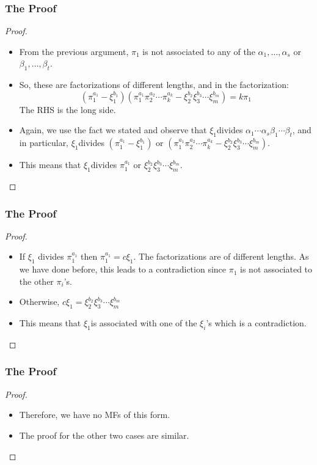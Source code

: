 \begin{frame}
  \frametitle{The Proof}
  \begin{proof}
    \begin{itemize}
      \item<1-> From the previous argument, $\pi_{1}$ is not associated to any of the $\alpha_{1},\ldots,\alpha_{s}$ or $\beta_{1},\ldots,\beta_{t}$. 
      \item<2-> So, these are factorizations of different lengths, and in the factorization:
	  $$(\pi_{1}^{a_{1}}-\xi_{1}^{b_{1}})(\pi_{1}^{a_{1}}\pi_{2}^{a_{2}}\cdots\pi_{k}^{a_{k}}-\xi_{2}^{b_{2}}\xi_{3}^{b_{3}}\cdots\xi_{m}^{b_{m}}) =k\pi_{1}$$
	The RHS is the long side. 
      \item<3-> Again, we use the fact we stated and observe that $\xi_{1}$divides $\alpha_{1}\cdots\alpha_{s}$$\beta_{1}\cdots\beta_{t}$, and in particular, $\xi_{1}$divides $(\pi_{1}^{a_{1}}-\xi_{1}^{b_{1}})$ or $(\pi_{1}^{a_{1}}\pi_{2}^{a_{2}}\cdots\pi_{k}^{a_{k}}-\xi_{2}^{b_{2}}\xi_{3}^{b_{3}}\cdots\xi_{m}^{b_{m}}).$
      \item<4-> This means that $\xi_{1}$divides $\pi_{1}^{a_{1}}$ or $\xi_{2}^{b_{2}}\xi_{3}^{b_{3}}\cdots\xi_{m}^{b_{m}}$.
    \end{itemize}
    \noqedsymbol
  \end{proof}
\end{frame}

\begin{frame}
  \frametitle{The Proof}
  \begin{proof}
    \begin{itemize}
      \item<1-> If $\xi_{1}$ divides $\pi_{1}^{a_{1}}$ then $\pi_{1}^{a_{1}}=c\xi_{1}$.
	The factorizations are of different lengths.
	As we have done before, this leads to a contradiction since $\pi_{1}$ is not associated to the other $\pi_{i}$'s. 
      \item<2-> Otherwise, $c\xi_{1}=\xi_{2}^{b_{2}}\xi_{3}^{b_{3}}\cdots\xi_{m}^{b_{m}}$
      \item<3-> This means that $\xi_{1}$is associated with one of the $\xi_{i}$'s which is a contradiction.
    \end{itemize}
    \noqedsymbol
  \end{proof}
\end{frame}

\begin{frame}
  \frametitle{The Proof}
  \begin{proof}
    \begin{itemize}
      \item<1-> Therefore, we have no MFs of this form.
      \item<2-> The proof for the other two cases are similar. 
    \end{itemize}
  \end{proof}
\end{frame}
